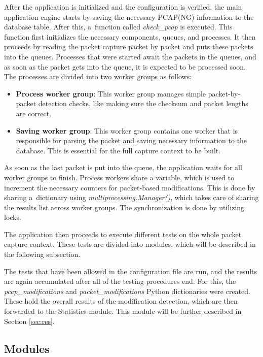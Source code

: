 \documentclass[
  printed,     %
  color,       %
  oneside,     %
  nosansbold,  %
  nocolorbold, %
  nolof,         %
  nolot,         %
]{fithesis4}
\begin{document}
After the application is initialized and the configuration is verified, the main application engine starts by saving the necessary PCAP(NG) information to the database table. After this, a~function called \textit{check\_pcap} is executed. This function first initializes the necessary components, queues, and processes. It then proceeds by reading the packet capture packet by packet and puts these packets into the queues. Processes that were started await the packets in the queues, and as soon as the packet gets into the queue, it is expected to be processed soon. The processes are divided into two worker groups as follows:

\begin{itemize}
    \item \textbf{Process worker group}: This worker group manages simple packet-by-packet detection checks, like making sure the checksum and packet lengths are correct.
    \item \textbf{Saving worker group}: This worker group contains one worker that is responsible for parsing the packet and saving necessary information to the database. This is essential for the full capture context to be built.
\end{itemize}

As soon as the last packet is put into the queue, the application waits for all worker groups to finish. Process workers share a variable, which is used to increment the necessary counters for packet-based modifications. This is done by sharing a~dictionary using \textit{multiprocessing.Manager()}, which takes care of sharing the results list across worker groups. The synchronization is done by utilizing locks.

The application then proceeds to execute different tests on the whole packet capture context. These tests are divided into modules, which will be described in the following subsection.

The tests that have been allowed in the configuration file are run, and the results are again accumulated after all of the testing procedures end. For this, the \textit{pcap\_modifications} and \textit{packet\_modifications} Python dictionaries were created. These hold the overall results of the modification detection, which are then forwarded to the Statistics module. This module will be further described in Section \ref{sec:res}.

\subsection{Modules}
\end{document}
